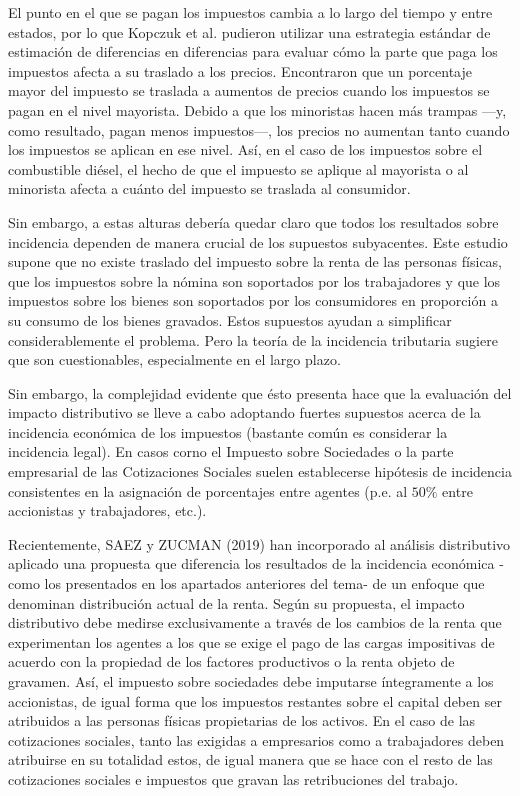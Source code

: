 \documentclass[10pt,a4paper]{article}
\begin{document}
El punto en el que se pagan los impuestos cambia a lo largo del tiempo y entre estados, por lo que Kopczuk et al. pudieron utilizar una estrategia estándar de estimación de diferencias en diferencias para evaluar cómo la parte que paga los impuestos afecta a su traslado a los precios. Encontraron que un porcentaje mayor del impuesto se traslada a aumentos de precios cuando los impuestos se pagan en el nivel mayorista. Debido a que los minoristas hacen más trampas —y, como resultado, pagan menos impuestos—, los precios no aumentan tanto cuando los impuestos se aplican en ese nivel. Así, en el caso de los impuestos sobre el combustible diésel, el hecho de que el impuesto se aplique al mayorista o al minorista afecta a cuánto del impuesto se traslada al consumidor.




Sin embargo, a estas alturas debería quedar claro que todos los resultados sobre incidencia dependen de manera crucial de los supuestos subyacentes. Este estudio supone que no existe traslado del impuesto sobre la renta de las personas físicas, que los impuestos sobre la nómina son soportados por los trabajadores y que los impuestos sobre los bienes son soportados por los consumidores en proporción a su consumo de los bienes gravados. Estos supuestos ayudan a simplificar considerablemente el problema. Pero la teoría de la incidencia tributaria sugiere que son cuestionables, especialmente en el largo plazo.

Sin embargo, la complejidad evidente que ésto presenta hace que la evaluación del impacto distributivo se lleve a cabo adoptando fuertes supuestos acerca de la incidencia económica de los impuestos (bastante común es considerar la incidencia legal). En casos corno el Impuesto sobre Sociedades o la parte empresarial de las Cotizaciones Sociales suelen establecerse hipótesis de incidencia consistentes en la asignación de porcentajes entre agentes (p.e. al $50\%$ entre accionistas y trabajadores, etc.).




Recientemente, SAEZ y ZUCMAN (2019) han incorporado al análisis distributivo aplicado una propuesta que diferencia los resultados de la incidencia económica -como los presentados en los apartados anteriores del tema- de un enfoque que denominan distribución actual de la renta. Según su propuesta, el impacto distributivo debe medirse exclusivamente a través de los cambios de la renta que experimentan los agentes a los que se exige el pago de las cargas impositivas de acuerdo con la propiedad de los factores productivos o la renta objeto de gravamen. Así, el impuesto sobre sociedades debe imputarse íntegramente a los accionistas, de igual forma que los impuestos restantes sobre el capital deben ser atribuidos a las personas físicas propietarias de los activos. En el caso de las cotizaciones sociales, tanto las exigidas a empresarios como a trabajadores deben atribuirse en su totalidad estos, de igual manera que se hace con el resto de las cotizaciones sociales e impuestos que gravan las retribuciones del trabajo.
\end{document}
